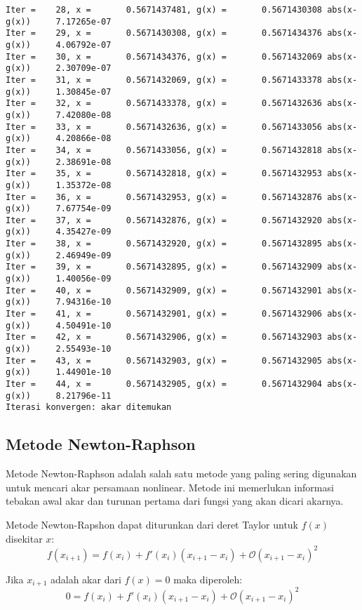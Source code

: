 \documentclass[11pt]{article}
\begin{document}
\begin{Verbatim}[commandchars=\\\{\}]
Iter =    28, x =       0.5671437481, g(x) =       0.5671430308 abs(x-g(x))     7.17265e-07
Iter =    29, x =       0.5671430308, g(x) =       0.5671434376 abs(x-g(x))     4.06792e-07
Iter =    30, x =       0.5671434376, g(x) =       0.5671432069 abs(x-g(x))     2.30709e-07
Iter =    31, x =       0.5671432069, g(x) =       0.5671433378 abs(x-g(x))     1.30845e-07
Iter =    32, x =       0.5671433378, g(x) =       0.5671432636 abs(x-g(x))     7.42080e-08
Iter =    33, x =       0.5671432636, g(x) =       0.5671433056 abs(x-g(x))     4.20866e-08
Iter =    34, x =       0.5671433056, g(x) =       0.5671432818 abs(x-g(x))     2.38691e-08
Iter =    35, x =       0.5671432818, g(x) =       0.5671432953 abs(x-g(x))     1.35372e-08
Iter =    36, x =       0.5671432953, g(x) =       0.5671432876 abs(x-g(x))     7.67754e-09
Iter =    37, x =       0.5671432876, g(x) =       0.5671432920 abs(x-g(x))     4.35427e-09
Iter =    38, x =       0.5671432920, g(x) =       0.5671432895 abs(x-g(x))     2.46949e-09
Iter =    39, x =       0.5671432895, g(x) =       0.5671432909 abs(x-g(x))     1.40056e-09
Iter =    40, x =       0.5671432909, g(x) =       0.5671432901 abs(x-g(x))     7.94316e-10
Iter =    41, x =       0.5671432901, g(x) =       0.5671432906 abs(x-g(x))     4.50491e-10
Iter =    42, x =       0.5671432906, g(x) =       0.5671432903 abs(x-g(x))     2.55493e-10
Iter =    43, x =       0.5671432903, g(x) =       0.5671432905 abs(x-g(x))     1.44901e-10
Iter =    44, x =       0.5671432905, g(x) =       0.5671432904 abs(x-g(x))     8.21796e-11
Iterasi konvergen: akar ditemukan

    \end{Verbatim}

    \hypertarget{metode-newton-raphson}{%
\subsection{Metode Newton-Raphson}\label{metode-newton-raphson}}

    Metode Newton-Raphson adalah salah satu metode yang paling sering
digunakan untuk mencari akar persamaan nonlinear. Metode ini memerlukan
informasi tebakan awal akar dan turunan pertama dari fungsi yang akan
dicari akarnya.

Metode Newton-Rapshon dapat diturunkan dari deret Taylor untuk \(f(x)\)
disekitar \(x\): \[
f(x_{i+1}) = f(x_{i}) +
f'(x_{i})(x_{i+1} - x_{i}) +
\mathcal{O}(x_{i+1} - x_{i})^2
\]

Jika \(x_{i+1}\) adalah akar dari \(f(x)=0\) maka diperoleh: \[
0 = f(x_{i}) +
f'(x_{i})(x_{i+1} - x_{i}) +
\mathcal{O}(x_{i+1} - x_{i})^2
\]
\end{document}
